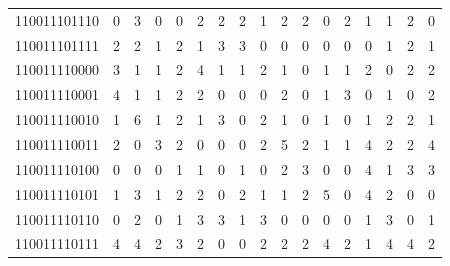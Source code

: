 \documentclass[10pt,a4paper]{article}
\begin{document}
\begin{longtable}{ |c|c|c|c|c|c|c|c|c|c|c|c|c|c|c|c|c| }
    110011101110              & 0                            & 3                                & 0                            & 0                              & 2   & 2   & 2   & 1   & 2   & 2   & 0   & 2   & 1   & 1   & 2   & 0   \\
    110011101111              & 2                            & 2                                & 1                            & 2                              & 1   & 3   & 3   & 0   & 0   & 0   & 0   & 0   & 0   & 1   & 2   & 1   \\
    110011110000              & 3                            & 1                                & 1                            & 2                              & 4   & 1   & 1   & 2   & 1   & 0   & 1   & 1   & 2   & 0   & 2   & 2   \\
    110011110001              & 4                            & 1                                & 1                            & 2                              & 2   & 0   & 0   & 0   & 2   & 0   & 1   & 3   & 0   & 1   & 0   & 2   \\
    110011110010              & 1                            & 6                                & 1                            & 2                              & 1   & 3   & 0   & 2   & 1   & 0   & 1   & 0   & 1   & 2   & 2   & 1   \\
    110011110011              & 2                            & 0                                & 3                            & 2                              & 0   & 0   & 0   & 2   & 5   & 2   & 1   & 1   & 4   & 2   & 2   & 4   \\
    110011110100              & 0                            & 0                                & 0                            & 1                              & 1   & 0   & 1   & 0   & 2   & 3   & 0   & 0   & 4   & 1   & 3   & 3   \\
    110011110101              & 1                            & 3                                & 1                            & 2                              & 2   & 0   & 2   & 1   & 1   & 2   & 5   & 0   & 4   & 2   & 0   & 0   \\
    110011110110              & 0                            & 2                                & 0                            & 1                              & 3   & 3   & 1   & 3   & 0   & 0   & 0   & 0   & 1   & 3   & 0   & 1   \\
    110011110111              & 4                            & 4                                & 2                            & 3                              & 2   & 0   & 0   & 2   & 2   & 2   & 4   & 2   & 1   & 4   & 4   & 2   \\

\end{longtable}
\end{document}
